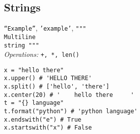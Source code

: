 \subsection{Strings}
\texttt{``Example''}, \texttt{'example'}, \texttt{""" \\
Multiline \\
string """}\\
\textit{Operations:} \texttt{+, *, len()}
\begin{lstlisting}
x = "hello there"
x.upper() # 'HELLO THERE'
x.split() # ['hello', 'there']
x.center(20) # '    hello there     '
t = "{} language"
t.format("python") # 'python language'
x.endswith("e") # True
x.startswith("x") # False
\end{lstlisting}
